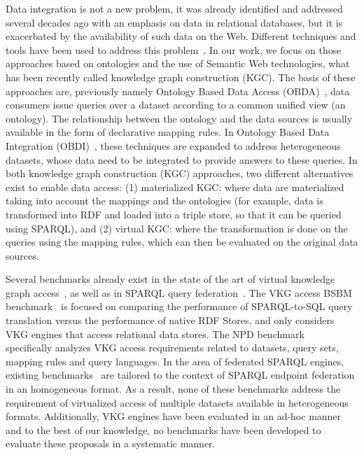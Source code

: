 Data integration is not a new problem, it was already identified and addressed several decades ago with an emphasis on data in relational databases, but it is exacerbated by the availability of such data on the Web. Different techniques and tools have been used to address this problem~\citep{Lenzerini02,Halevy18}. In our work, we focus on those approaches based on ontologies and the use of Semantic Web technologies, what has been recently called knowledge graph construction (KGC). The basis of these approaches are, previously namely Ontology Based Data Access (OBDA)~\citep{poggi2008linking}, data consumers issue queries over a dataset according to a common unified view (an ontology). The relationship between the ontology and the data sources is usually available in the form of declarative mapping rules. In Ontology Based Data Integration (OBDI)~\citep{poggi2008linking}, these techniques are expanded to address heterogeneous datasets, whose data need to be integrated to provide answers to these queries. In both knowledge graph construction (KGC) approaches, two different alternatives exist to enable data access: (1) materialized KGC: where data are materialized taking into account the mappings and the ontologies (for example, data is transformed into RDF and loaded into a triple store, so that it can be queried using SPARQL), and (2) virtual KGC: where the transformation is done on the queries using the mapping rules, which can then be evaluated on the original data sources. 





Several benchmarks already exist in the state of the art of virtual knowledge graph access~\cite{bizer2009berlin,lanti2015npd}, as well as in SPARQL query federation~\cite{schmidt2011fedbench,hasnain2017biofed,montoya2012benchmarking}. The VKG access BSBM benchmark~\cite{bizer2009berlin} is focused on comparing the performance of SPARQL-to-SQL query translation versus the performance of native RDF Stores, and only considers VKG engines that access relational data stores. The NPD benchmark~\cite{lanti2015npd} specifically analyzes VKG access requirements related to datasets, query sets, mapping rules and query languages. In the area of federated SPARQL engines, existing benchmarks~\cite{schmidt2011fedbench,hasnain2017biofed,montoya2012benchmarking} are tailored to the context of SPARQL endpoint federation in an homogeneous format. As a result, none of these benchmarks address the requirement of virtualized access of multiple datasets available in heterogeneous formats. Additionally, VKG engines have been evaluated in an ad-hoc manner~\cite{endris2019ontario,mami2019querying} and to the best of our knowledge, no benchmarks have been developed to evaluate these proposals in a systematic manner. 

